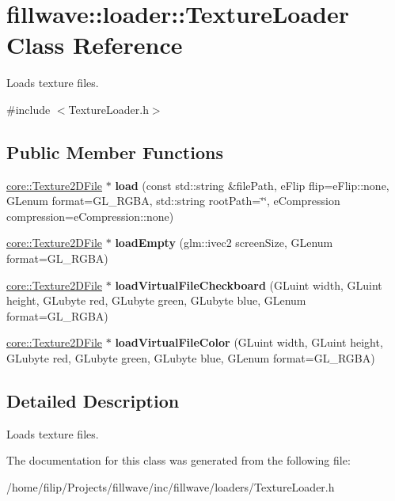 \hypertarget{classfillwave_1_1loader_1_1TextureLoader}{}\section{fillwave\+:\+:loader\+:\+:Texture\+Loader Class Reference}
\label{classfillwave_1_1loader_1_1TextureLoader}


Loads texture files.  




{\ttfamily \#include $<$Texture\+Loader.\+h$>$}

\subsection*{Public Member Functions}
\begin{DoxyCompactItemize}
\item 
\hypertarget{classfillwave_1_1loader_1_1TextureLoader_aef336c1e9f83af2a04e09d313b937adc}{}\hyperlink{classfillwave_1_1core_1_1Texture2DFile}{core\+::\+Texture2\+D\+File} $\ast$ {\bfseries load} (const std\+::string \&file\+Path, e\+Flip flip=e\+Flip\+::none, G\+Lenum format=G\+L\+\_\+\+R\+G\+B\+A, std\+::string root\+Path=\char`\"{}\char`\"{}, e\+Compression compression=e\+Compression\+::none)\label{classfillwave_1_1loader_1_1TextureLoader_aef336c1e9f83af2a04e09d313b937adc}

\item 
\hypertarget{classfillwave_1_1loader_1_1TextureLoader_af2ea2c760bbfae96ef4b36fb387c4ea8}{}\hyperlink{classfillwave_1_1core_1_1Texture2DFile}{core\+::\+Texture2\+D\+File} $\ast$ {\bfseries load\+Empty} (glm\+::ivec2 screen\+Size, G\+Lenum format=G\+L\+\_\+\+R\+G\+B\+A)\label{classfillwave_1_1loader_1_1TextureLoader_af2ea2c760bbfae96ef4b36fb387c4ea8}

\item 
\hypertarget{classfillwave_1_1loader_1_1TextureLoader_a41e3375108af37b47e25c88b9d721b5b}{}\hyperlink{classfillwave_1_1core_1_1Texture2DFile}{core\+::\+Texture2\+D\+File} $\ast$ {\bfseries load\+Virtual\+File\+Checkboard} (G\+Luint width, G\+Luint height, G\+Lubyte red, G\+Lubyte green, G\+Lubyte blue, G\+Lenum format=G\+L\+\_\+\+R\+G\+B\+A)\label{classfillwave_1_1loader_1_1TextureLoader_a41e3375108af37b47e25c88b9d721b5b}

\item 
\hypertarget{classfillwave_1_1loader_1_1TextureLoader_a64c9672227d903c96103466fa7e429ea}{}\hyperlink{classfillwave_1_1core_1_1Texture2DFile}{core\+::\+Texture2\+D\+File} $\ast$ {\bfseries load\+Virtual\+File\+Color} (G\+Luint width, G\+Luint height, G\+Lubyte red, G\+Lubyte green, G\+Lubyte blue, G\+Lenum format=G\+L\+\_\+\+R\+G\+B\+A)\label{classfillwave_1_1loader_1_1TextureLoader_a64c9672227d903c96103466fa7e429ea}

\end{DoxyCompactItemize}


\subsection{Detailed Description}
Loads texture files. 

The documentation for this class was generated from the following file\+:\begin{DoxyCompactItemize}
\item 
/home/filip/\+Projects/fillwave/inc/fillwave/loaders/Texture\+Loader.\+h\end{DoxyCompactItemize}
